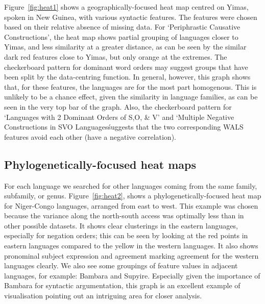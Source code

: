 \documentclass[11pt]{article}
\begin{document}
Figure~\ref{fig:heat1} shows a geographically-focused heat map centred on Yimas, spoken in New Guinea, with various syntactic features. The features were chosen based on their relative absence of missing data. For `Periphrastic Causative Constructions', the heat map shows partial grouping of languages closer to Yimas, and less similarity at a greater distance, as can be seen by the similar dark red features close to Yimas, but only orange at the extremes. The checkerboard pattern for dominant word orders may suggest groups that have been split by the data-centring function. In general, however, this graph shows that, for these features, the languages are for the most part homogenous. This is unlikely to be a chance effect, given the similarity in language families, as can be seen in the very top bar of the graph. Also, the checkerboard pattern for `Languages with 2 Dominant Orders of S,O, \& V' and `Multiple Negative Constructions in SVO Languages\' suggests that the two corresponding WALS features avoid each other (have a negative correlation). 

\subsection{Phylogenetically-focused heat maps}

For each language we searched for other languages coming from the same family, subfamily, or genus. Figure~\ref{fig:heat2}, shows a phylogenetically-focused heat map for Niger-Congo languages, arranged from east to west. This example was chosen because the variance along the north-south access was optimally less than in other possible datasets. %
It shows clear clusterings in the eastern languages, especially for negation orders; this can be seen by looking at the red points in eastern languages compared to the yellow in the western languages. It also shows pronominal subject expression and agreement marking agreement for the western languages clearly. We also see some groupings of feature values in adjacent languages, for example: Bambara and Supyire. Especially given the importance of Bambara for syntactic argumentation\cite{culy}, this graph is an excellent example of visualisation pointing out an intriguing area for closer analysis.

\end{document}
